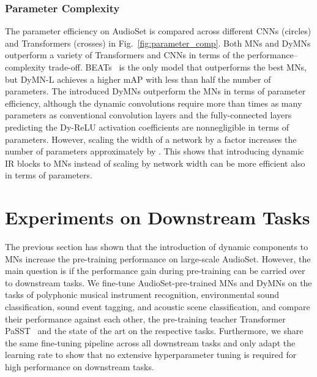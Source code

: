 \documentclass[lettersize,journal]{IEEEtran}
\begin{document}
\subsubsection{Parameter Complexity} The parameter efficiency on AudioSet is compared across different CNNs (circles) and Transformers (crosses) in Fig.~\ref{fig:parameter_comp}. Both MNs and DyMNs outperform a variety of Transformers and CNNs in terms of the performance--complexity trade-off. BEATs~\cite{chen2022beats} is the only model that outperforms the best MNs, but DyMN-L achieves a higher mAP with less than half the number of parameters. The introduced DyMNs outperform the MNs in terms of parameter efficiency, although the dynamic convolutions require more than  times as many parameters as conventional convolution layers and the fully-connected layers predicting the Dy-ReLU activation coefficients are nonnegligible in terms of parameters. However, scaling the width of a network by a factor  increases the number of parameters approximately by . This shows that introducing dynamic IR blocks to MNs instead of scaling by network width can be more efficient also in terms of parameters. 

















\section{Experiments on Downstream Tasks}
\label{sec:experiments}

The previous section has shown that the introduction of dynamic components to MNs increase the pre-training performance on large-scale AudioSet.
However, the main question is if the performance gain during pre-training can be carried over to downstream tasks. We fine-tune AudioSet-pre-trained MNs and DyMNs on the tasks of polyphonic musical instrument recognition, environmental sound classification, sound event tagging, and acoustic scene classification, and compare their performance against each other, the pre-training teacher Transformer PaSST~\cite{Koutini21Passt} and the state of the art on the respective tasks. Furthermore, we share the same fine-tuning pipeline across all downstream tasks and only adapt the learning rate to show that no extensive hyperparameter tuning is required for high performance on downstream tasks.
\end{document}
